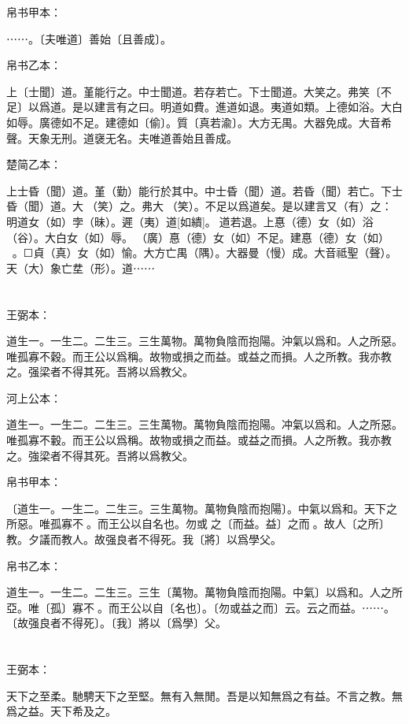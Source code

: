 \documentclass[a5paper]{ctexbook}
\begin{document}
    帛书甲本：

    ⋯⋯。〔夫唯道〕善始〔且善成〕。

    帛书乙本：

    上〔士聞〕道。堇能行之。中士聞道。若存若亡。下士聞道。大笑之。弗笑〔不足〕以爲道。是以建言有之曰。明道如費。進道如退。夷道如類。上德如浴。大白如辱。廣德如不足。建德如〔偷〕。質〔真若渝〕。大方无禺。大器免成。大音希聲。天象无刑。道襃无名。夫唯道善始且善成。

    楚简乙本：

    上士昏（聞）道。堇（勤）能行於其中。中士昏（聞）道。若昏（聞）若亡。下士昏（聞）道。大𦬫（笑）之。弗大𦬫（笑）。不足以爲道矣。是以建言又（有）之：明道女（如）孛（昧）。遲（夷）道[如繢]。☐道若退。上惪（德）女（如）浴（谷）。大白女（如）辱。󼧊（廣）惪（德）女（如）不足。建惪（德）女（如）󲳴☐。☐貞（真）女（如）愉。大方亡禺（隅）。大器曼（慢）成。大音祗聖（聲）。天（大）象亡坓（形）。道⋯⋯

    \chapter{}
    王弼本：

    道生一。一生二。二生三。三生萬物。萬物負陰而抱陽。沖氣以爲和。人之所惡。唯孤寡不穀。而王公以爲稱。故物或損之而益。或益之而損。人之所教。我亦教之。强梁者不得其死。吾將以爲教父。

    河上公本：

    道生一。一生二。二生三。三生萬物。萬物負陰而抱陽。冲氣以爲和。人之所惡。唯孤寡不轂。而王公以爲稱。故物或損之而益。或益之而損。人之所教。我亦教之。強梁者不得其死。吾將以爲教父。

    帛书甲本：

    〔道生一。一生二。二生三。三生萬物。萬物負陰而抱陽〕。中氣以爲和。天下之所惡。唯孤寡不𥞤。而王公以自名也。勿或𢿃之〔而益。益〕之而𢿃。故人〔之所〕教。夕議而教人。故强良者不得死。我〔將〕以爲學父。

    帛书乙本：

    道生一。一生二。二生三。三生〔萬物。萬物負陰而抱陽。中氣〕以爲和。人之所亞。唯〔孤〕寡不𥞤。而王公以自〔名也〕。〔勿或益之而〕云。云之而益。⋯⋯。〔故强良者不得死〕。〔我〕將以〔爲學〕父。

    \chapter{}
    王弼本：

    天下之至柔。馳騁天下之至堅。無有入無閒。吾是以知無爲之有益。不言之教。無爲之益。天下希及之。
\end{document}
